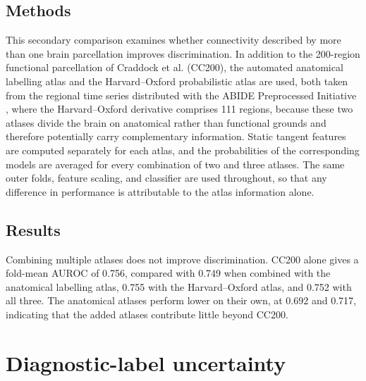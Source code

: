 \documentclass[11pt,a4paper]{article}
\begin{document}
\subsection{Methods}
This secondary comparison examines whether connectivity described by more than one brain parcellation improves discrimination. In addition to the 200-region functional parcellation of Craddock et al. (CC200), the automated anatomical labelling atlas \citep{TzourioMazoyeretal2002} and the Harvard--Oxford probabilistic atlas are used, both taken from the regional time series distributed with the ABIDE Preprocessed Initiative \citep{Craddocketal2013}, where the Harvard--Oxford derivative comprises 111 regions, because these two atlases divide the brain on anatomical rather than functional grounds and therefore potentially carry complementary information. Static tangent features are computed separately for each atlas, and the probabilities of the corresponding models are averaged for every combination of two and three atlases. The same outer folds, feature scaling, and classifier are used throughout, so that any difference in performance is attributable to the atlas information alone.

\subsection{Results}
Combining multiple atlases does not improve discrimination. CC200 alone gives a fold-mean AUROC of 0.756, compared with 0.749 when combined with the anatomical labelling atlas, 0.755 with the Harvard--Oxford atlas, and 0.752 with all three. The anatomical atlases perform lower on their own, at 0.692 and 0.717, indicating that the added atlases contribute little beyond CC200.

\section{Diagnostic-label uncertainty}
\label{sec:supp-label-noise}
\end{document}
